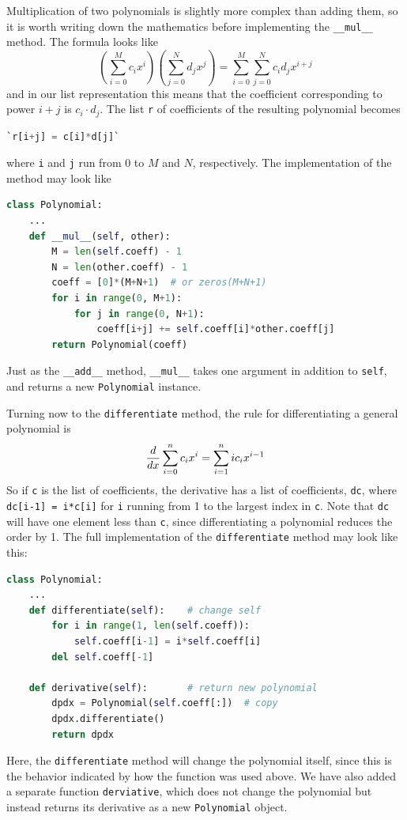 \documentclass[graybox,envcountchap,sectrefs,final]{svmonodo}
\begin{document}
Multiplication of two polynomials is slightly more complex than adding them, so it is worth writing down the
mathematics before implementing the \Verb!__mul__! method. The formula looks like
\[ \left(\sum_{i=0}^Mc_ix^i\right)\left(\sum_{j=0}^N d_jx^j\right)
= \sum_{i=0}^M \sum_{j=0}^N c_id_j x^{i+j} \]
and in our list representation this means that the coefficient corresponding to power $i+j$ is $c_i\cdot d_j$. The
list \texttt{r} of coefficients of the resulting polynomial becomes
\begin{lstlisting}[language=Python,style=blue1]
`r[i+j] = c[i]*d[j]`
\end{lstlisting}
where \texttt{i} and \texttt{j} run from 0 to $M$ and $N$, respectively. The implementation of the method may look like
\begin{lstlisting}[language=Python,style=blue1]
class Polynomial:
    ...
    def __mul__(self, other):
        M = len(self.coeff) - 1
        N = len(other.coeff) - 1
        coeff = [0]*(M+N+1)  # or zeros(M+N+1)
        for i in range(0, M+1):
            for j in range(0, N+1):
                coeff[i+j] += self.coeff[i]*other.coeff[j]
        return Polynomial(coeff)
\end{lstlisting}
Just as the \Verb!__add__! method, \Verb!__mul__! takes one argument in addition to \texttt{self}, and returns a new \texttt{Polynomial} instance.

Turning now to the \texttt{differentiate} method, the rule for differentiating a general polynomial is
\[ {d\over dx}\sum_{i=0}^n c_ix^i = \sum_{i=1}^n ic_ix^{i-1}\]
So if \texttt{c} is the list of coefficients, the derivative has a list
of coefficients, \texttt{dc}, where \texttt{dc[i-1] = i*c[i]} for \texttt{i} running from 1 to the largest index in \texttt{c}.
Note that \texttt{dc} will have one element less than \texttt{c}, since differentiating a polynomial reduces the order by 1.
The full implementation of the \texttt{differentiate} method may look like this:
\begin{lstlisting}[language=Python,style=blue1]
class Polynomial:
    ...
    def differentiate(self):    # change self
        for i in range(1, len(self.coeff)):
            self.coeff[i-1] = i*self.coeff[i]
        del self.coeff[-1]

    def derivative(self):       # return new polynomial
        dpdx = Polynomial(self.coeff[:])  # copy
        dpdx.differentiate()
        return dpdx
\end{lstlisting}
Here, the \texttt{differentiate} method will change the polynomial itself, since this is the behavior indicated by how the function
was used above. We have also added a separate function \texttt{derviative}, which does not change the polynomial but instead returns
its derivative as a new \texttt{Polynomial} object.
\end{document}
